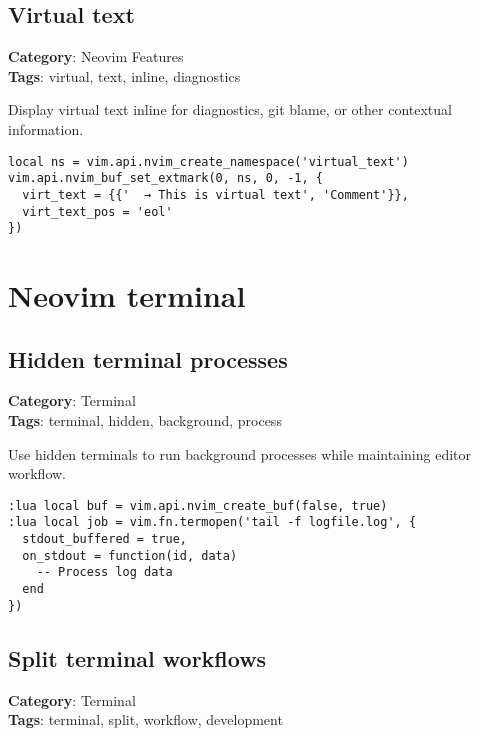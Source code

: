 {{{{{{{{{{\section{Virtual text}

\textbf{Category}: Neovim Features\\ \textbf{Tags}: virtual, text, inline, diagnostics
\vspace{0.5cm}

Display virtual text inline for diagnostics, git blame, or other contextual information.

\begin{Exa*}{}
\begin{Verbatim}[fontsize=\footnotesize, breaklines, breakanywhere]
local ns = vim.api.nvim_create_namespace('virtual_text')
vim.api.nvim_buf_set_extmark(0, ns, 0, -1, {
  virt_text = {{'  → This is virtual text', 'Comment'}},
  virt_text_pos = 'eol'
})
\end{Verbatim}
\end{Exa*}

\chapter{Neovim terminal}
\section{Hidden terminal processes}

\textbf{Category}: Terminal\\ \textbf{Tags}: terminal, hidden, background, process
\vspace{0.5cm}

Use hidden terminals to run background processes while maintaining editor workflow.

\begin{Exa*}{}
\begin{Verbatim}[fontsize=\footnotesize, breaklines, breakanywhere]
:lua local buf = vim.api.nvim_create_buf(false, true)
:lua local job = vim.fn.termopen('tail -f logfile.log', {
  stdout_buffered = true,
  on_stdout = function(id, data) 
    -- Process log data
  end
})
\end{Verbatim}
\end{Exa*}

\section{Split terminal workflows}

\textbf{Category}: Terminal\\ \textbf{Tags}: terminal, split, workflow, development
\vspace{0.5cm}

}}}}}}}}}}
